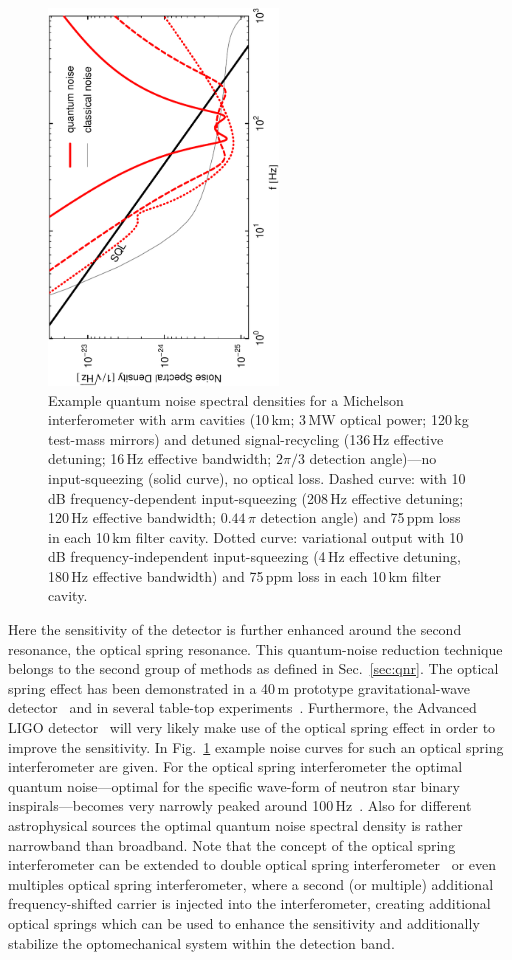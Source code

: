 \begin{figure}[h]
\centerline{\includegraphics[height=10cm,angle=-90]{./Sec_Optics/EToptMich.pdf}}
\caption{Example quantum noise spectral densities for a Michelson
interferometer with arm cavities (10\,km; 3\,MW optical power;
120\,kg test-mass mirrors) and detuned signal-recycling (136\,Hz
effective detuning; 16\,Hz effective bandwidth; $2\pi/3$ detection
angle)---no input-squeezing (solid curve), no optical loss.
Dashed curve: with 10\,dB frequency-dependent input-squeezing
(208\,Hz effective detuning; 120\,Hz effective bandwidth;
$0.44\,\pi$ detection angle) and 75\,ppm loss in each 10\,km
filter cavity. Dotted curve: variational output with 10\,dB
frequency-independent input-squeezing (4\,Hz effective detuning,
180\,Hz effective bandwidth) and 75\,ppm loss in each 10\,km
filter cavity.} \label{Fig:Michoptqnoise}
\end{figure}
%
Here the sensitivity of the detector is further enhanced around
the second resonance, the optical spring resonance. This
quantum-noise reduction technique belongs to the second group of
methods as defined in Sec.~\ref{sec:qnr}. The optical
spring effect has been demonstrated in a 40\,m prototype
gravitational-wave detector~\cite{Miyakawa2006} and in several
table-top experiments~\cite{Corbitt2007}. Furthermore, the
Advanced LIGO detector~\cite{AdvancedLIGOReference2009} will very likely make use of
the optical spring effect in order to improve the sensitivity. In
Fig.~\ref{Fig:Michoptqnoise} example noise curves for such an
optical spring interferometer are given. For the optical spring
interferometer the optimal quantum noise---optimal for the
specific wave-form of neutron star binary inspirals---becomes
very narrowly peaked around 100\,Hz~\cite{Mueller-Ebhardt2009}. Also
for different astrophysical sources the optimal quantum noise
spectral density is rather narrowband than broadband. Note that
the concept of the optical spring interferometer can be extended
to double optical spring interferometer~\cite{Rehbein2008} or even
multiples optical spring interferometer, where a second (or
multiple) additional frequency-shifted carrier is injected into
the interferometer, creating additional optical springs which can
be used to enhance the sensitivity and additionally stabilize the
optomechanical system within the detection band.


